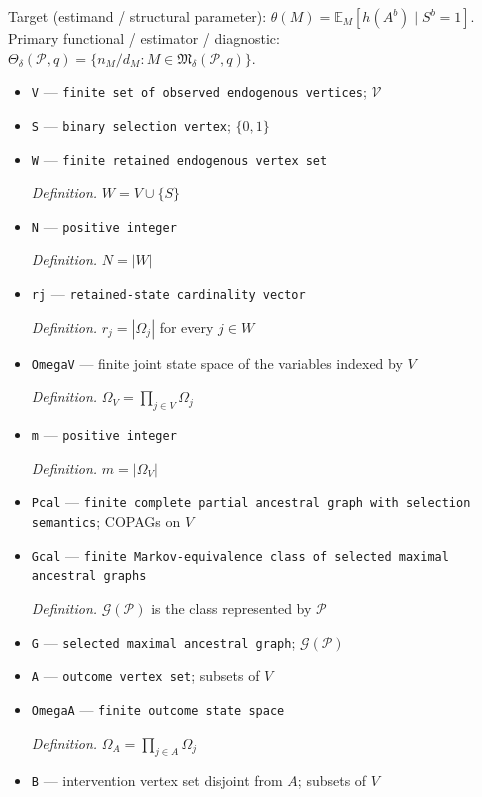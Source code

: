 \documentclass{article}
\begin{document}
Target (estimand / structural parameter): \(\theta(M)=\mathbb E_M[h(A^b)\mid S^b=1]\).
Primary functional / estimator / diagnostic: \(\Theta_\delta(\mathcal P,q)=\{n_M/d_M:M\in\mathfrak M_\delta(\mathcal P,q)\}\).
\begin{itemize}
  \item \texttt{V} --- \texttt{finite set of observed endogenous vertices}; \(\mathcal V\)
  \item \texttt{S} --- \texttt{binary selection vertex}; \(\{0,1\}\)
  \item \texttt{W} --- \texttt{finite retained endogenous vertex set}
  \par\smallskip\noindent\emph{Definition.} \(W=V\cup\{S\}\)
  \item \texttt{N} --- \texttt{positive integer}
  \par\smallskip\noindent\emph{Definition.} \(N=|W|\)
  \item \texttt{rj} --- \texttt{retained-\allowbreak{}state cardinality vector}
  \par\smallskip\noindent\emph{Definition.} \(r_j=|\Omega_j|\) for every \(j\in W\)
  \item \texttt{OmegaV} --- finite joint state space of the variables indexed by \(V\)
  \par\smallskip\noindent\emph{Definition.} \(\Omega_V=\prod_{j\in V}\Omega_j\)
  \item \texttt{m} --- \texttt{positive integer}
  \par\smallskip\noindent\emph{Definition.} \(m=|\Omega_V|\)
  \item \texttt{Pcal} --- \texttt{finite complete partial ancestral graph with selection semantics}; COPAGs on \(V\)
  \item \texttt{Gcal} --- \texttt{finite Markov-\allowbreak{}equivalence class of selected maximal ancestral graphs}
  \par\smallskip\noindent\emph{Definition.} \(\mathcal G(\mathcal P)\) is the class represented by \(\mathcal P\)
  \item \texttt{G} --- \texttt{selected maximal ancestral graph}; \(\mathcal G(\mathcal P)\)
  \item \texttt{A} --- \texttt{outcome vertex set}; subsets of \(V\)
  \item \texttt{OmegaA} --- \texttt{finite outcome state space}
  \par\smallskip\noindent\emph{Definition.} \(\Omega_A=\prod_{j\in A}\Omega_j\)
  \item \texttt{B} --- intervention vertex set disjoint from \(A\); subsets of \(V\)

\end{itemize}
\end{document}
